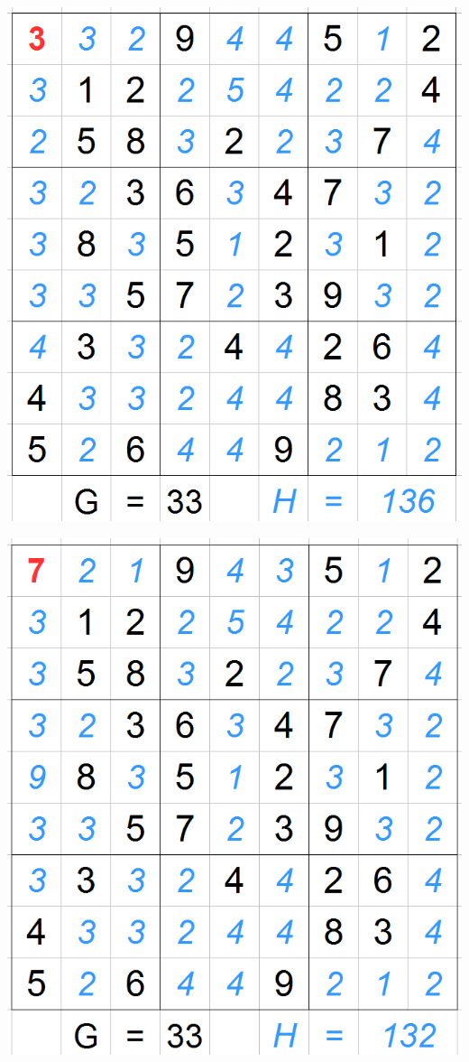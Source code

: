 \begin{frame}

\begin{minipage}{.45\textwidth}

\includegraphics[scale=0.2]{images/ASTARExample/1_1.png}

\includegraphics[scale=0.2]{images/ASTARExample/1_3.png}



\end{minipage}
\end{frame}
